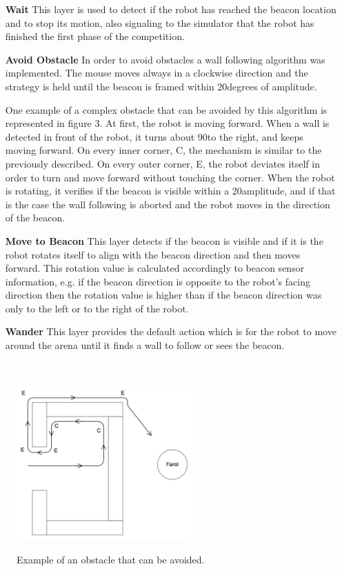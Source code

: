 \documentclass[oribibl]{llncs}
\begin{document}
\begin{itemize}
  \item[\textbf{Wait}]
  This layer is used to detect if the robot has reached the beacon location and to stop its motion, also signaling to the simulator that the robot has finished the first phase of the competition.
  \item[\textbf{Avoid Obstacle}]
  In order to avoid obstacles a wall following algorithm was implemented. The mouse moves always in a clockwise direction and the strategy is held until the beacon is framed within 20\textdegree degrees of amplitude.
  
  One example of a complex obstacle that can be avoided by this algorithm is represented in figure 3. At first, the robot is moving forward. When a wall is detected in front of the robot, it turns about 90\textdegree to the right, and keeps moving forward. On every inner corner,  C, the mechanism is similar to the previously described. On every outer corner, E, the robot deviates itself in order to turn and move forward without touching the corner. When the robot is rotating, it verifies if the beacon is visible within a 20\textdegree amplitude, and if that is the case the wall following is aborted and the robot moves in the direction of the beacon.
  
  \item[\textbf{Move to Beacon}]
  This layer detects if the beacon is visible and if it is the robot rotates itself to align with the beacon direction and then moves forward. This rotation value is calculated accordingly to beacon sensor information, e.g. if the beacon direction is opposite to the robot's facing direction then the rotation value is higher than if the beacon direction was only to the left or to the right of the robot.
  
  \item[\textbf{Wander}]
  This layer provides the default action which is for the robot to move around the arena until it finds a wall to follow or sees the beacon.
\end{itemize}
\hfill \\
\begin{figure}
  \centering
  \includegraphics[width=0.6\textwidth]{obstaculo1.png}
  \label{fig:obstaculo1}
  \caption{Example of an obstacle that can be avoided.}
\end{figure}
\end{document}
